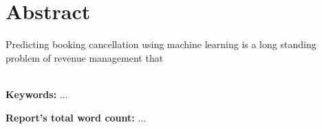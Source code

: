 \chapter*{\center \Large  Abstract}
Predicting booking cancellation using machine learning is a long standing problem of revenue management that 

~\\[1cm]
\noindent
\textbf{Keywords:} ...

\vfill
\noindent
\textbf{Report's total word count:} ...

